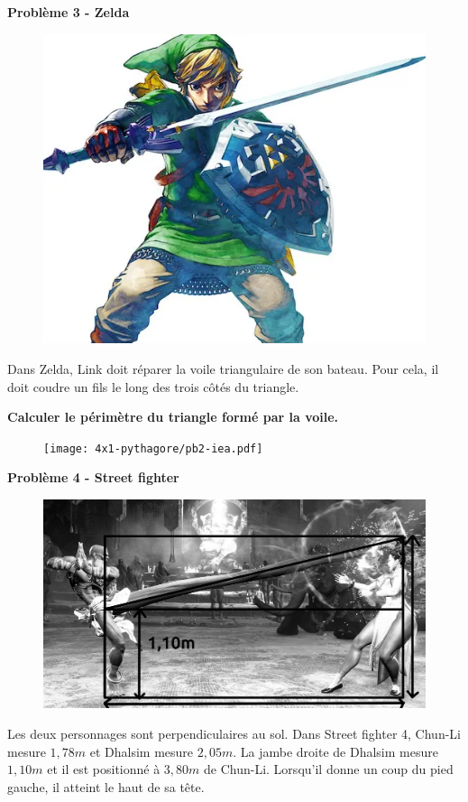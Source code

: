 \begin{multicols}{2} 
  \textbf{Problème 3 - Zelda} \\

  \begin{figure}[H]
    \centering
    \includegraphics[width=0.5\linewidth]{4x1-pythagore/pb1-link.png}
  \end{figure}

  Dans Zelda, Link doit réparer la voile triangulaire de son bateau. Pour cela, il doit coudre un fils le long des trois côtés du triangle. 

  \textbf{Calculer le périmètre du triangle formé par la voile.} \columnbreak

  \begin{figure}[H]
    \centering
    \texttt{[image: 4x1-pythagore/pb2-iea.pdf]}
  \end{figure}

\end{multicols}

\textbf{Problème 4 - Street fighter} \\

\begin{figure}[H]
  \centering
  \includegraphics[width=0.5\linewidth]{4x1-pythagore/sf4.jpg}
\end{figure}

Les deux personnages sont perpendiculaires au sol. Dans Street fighter 4, Chun-Li mesure $1,78m$ et Dhalsim mesure $2,05m$. La jambe droite de Dhalsim mesure $1,10m$ et il est positionné à $3,80m$ de Chun-Li. Lorsqu'il donne un coup du pied gauche, il atteint le haut de sa tête. 

